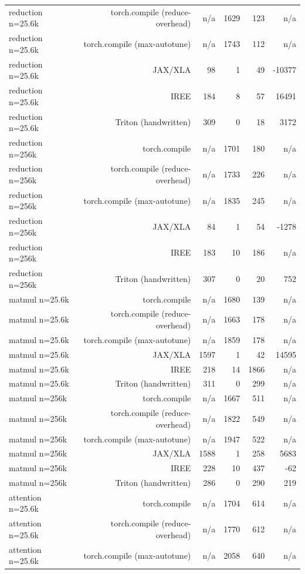 \begin{tabular}{lrrrrr}
reduction n=25.6k & torch.compile (reduce-overhead) & n/a & 1629 & 123 & n/a \\
reduction n=25.6k & torch.compile (max-autotune) & n/a & 1743 & 112 & n/a \\
reduction n=25.6k & JAX/XLA & 98 & 1 & 49 & -10377 \\
reduction n=25.6k & IREE & 184 & 8 & 57 & 16491 \\
reduction n=25.6k & Triton (handwritten) & 309 & 0 & 18 & 3172 \\
reduction n=256k & torch.compile & n/a & 1701 & 180 & n/a \\
reduction n=256k & torch.compile (reduce-overhead) & n/a & 1733 & 226 & n/a \\
reduction n=256k & torch.compile (max-autotune) & n/a & 1835 & 245 & n/a \\
reduction n=256k & JAX/XLA & 84 & 1 & 54 & -1278 \\
reduction n=256k & IREE & 183 & 10 & 186 & n/a \\
reduction n=256k & Triton (handwritten) & 307 & 0 & 20 & 752 \\
matmul n=25.6k & torch.compile & n/a & 1680 & 139 & n/a \\
matmul n=25.6k & torch.compile (reduce-overhead) & n/a & 1663 & 178 & n/a \\
matmul n=25.6k & torch.compile (max-autotune) & n/a & 1859 & 178 & n/a \\
matmul n=25.6k & JAX/XLA & 1597 & 1 & 42 & 14595 \\
matmul n=25.6k & IREE & 218 & 14 & 1866 & n/a \\
matmul n=25.6k & Triton (handwritten) & 311 & 0 & 299 & n/a \\
matmul n=256k & torch.compile & n/a & 1667 & 511 & n/a \\
matmul n=256k & torch.compile (reduce-overhead) & n/a & 1822 & 549 & n/a \\
matmul n=256k & torch.compile (max-autotune) & n/a & 1947 & 522 & n/a \\
matmul n=256k & JAX/XLA & 1588 & 1 & 258 & 5683 \\
matmul n=256k & IREE & 228 & 10 & 437 & -62 \\
matmul n=256k & Triton (handwritten) & 286 & 0 & 290 & 219 \\
attention n=25.6k & torch.compile & n/a & 1704 & 614 & n/a \\
attention n=25.6k & torch.compile (reduce-overhead) & n/a & 1770 & 612 & n/a \\
attention n=25.6k & torch.compile (max-autotune) & n/a & 2058 & 640 & n/a \\

\end{tabular}
